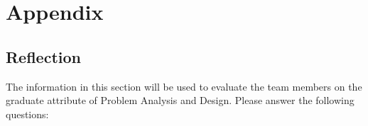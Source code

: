 \documentclass[12pt, titlepage]{article}
\begin{document}
% 

\newpage

\section{Appendix}



\subsection{Reflection}

The information in this section will be used to evaluate the team members on the graduate attribute
of Problem Analysis and Design. Please answer the following questions:
\end{document}
